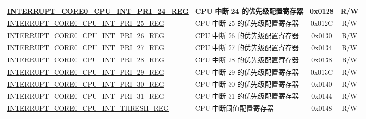 \begin{longtable}{ | p{8.0cm} | p{6.4cm} | c | c| }
\hyperref[regdesc:INTERRUPTCORE0CPUINTPRI0REG]{INTERRUPT\_CORE0\_CPU\_INT\_PRI\_24\_REG} & CPU 中断 24 的优先级配置寄存器 & 0x0128 & R/W \\ \hline
\hyperref[regdesc:INTERRUPTCORE0CPUINTPRI0REG]{INTERRUPT\_CORE0\_CPU\_INT\_PRI\_25\_REG} & CPU 中断 25 的优先级配置寄存器 & 0x012C & R/W \\ \hline
\hyperref[regdesc:INTERRUPTCORE0CPUINTPRI0REG]{INTERRUPT\_CORE0\_CPU\_INT\_PRI\_26\_REG} & CPU 中断 26 的优先级配置寄存器 & 0x0130 & R/W \\ \hline
\hyperref[regdesc:INTERRUPTCORE0CPUINTPRI0REG]{INTERRUPT\_CORE0\_CPU\_INT\_PRI\_27\_REG} & CPU 中断 27 的优先级配置寄存器 & 0x0134 & R/W \\ \hline
\hyperref[regdesc:INTERRUPTCORE0CPUINTPRI0REG]{INTERRUPT\_CORE0\_CPU\_INT\_PRI\_28\_REG} & CPU 中断 28 的优先级配置寄存器 & 0x0138 & R/W \\ \hline
\hyperref[regdesc:INTERRUPTCORE0CPUINTPRI0REG]{INTERRUPT\_CORE0\_CPU\_INT\_PRI\_29\_REG} & CPU 中断 29 的优先级配置寄存器 & 0x013C & R/W \\ \hline
\hyperref[regdesc:INTERRUPTCORE0CPUINTPRI0REG]{INTERRUPT\_CORE0\_CPU\_INT\_PRI\_30\_REG} & CPU 中断 30 的优先级配置寄存器 & 0x0140 & R/W \\ \hline
\hyperref[regdesc:INTERRUPTCORE0CPUINTPRI0REG]{INTERRUPT\_CORE0\_CPU\_INT\_PRI\_31\_REG} & CPU 中断 31 的优先级配置寄存器 & 0x0144 & R/W \\ \hline
\hyperref[regdesc:INTERRUPTCORE0CPUINTTHRESHREG]{INTERRUPT\_CORE0\_CPU\_INT\_THRESH\_REG} & CPU 中断阈值配置寄存器 & 0x0148 & R/W \\ \hline
\end{longtable}
